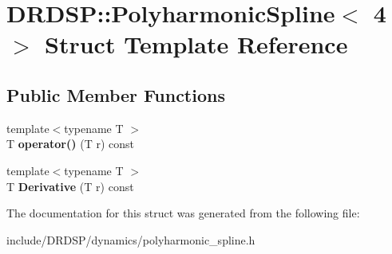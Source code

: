 \hypertarget{struct_d_r_d_s_p_1_1_polyharmonic_spline_3_014_01_4}{\section{D\-R\-D\-S\-P\-:\-:Polyharmonic\-Spline$<$ 4 $>$ Struct Template Reference}
\label{struct_d_r_d_s_p_1_1_polyharmonic_spline_3_014_01_4}
}
\subsection*{Public Member Functions}
\begin{DoxyCompactItemize}
\item 
\hypertarget{struct_d_r_d_s_p_1_1_polyharmonic_spline_3_014_01_4_a59308bf407d1523bf4c3a7f42e00b194}{{\footnotesize template$<$typename T $>$ }\\T {\bfseries operator()} (T r) const }\label{struct_d_r_d_s_p_1_1_polyharmonic_spline_3_014_01_4_a59308bf407d1523bf4c3a7f42e00b194}

\item 
\hypertarget{struct_d_r_d_s_p_1_1_polyharmonic_spline_3_014_01_4_ac7ef51f745007e1c1d475a40761ea06c}{{\footnotesize template$<$typename T $>$ }\\T {\bfseries Derivative} (T r) const }\label{struct_d_r_d_s_p_1_1_polyharmonic_spline_3_014_01_4_ac7ef51f745007e1c1d475a40761ea06c}

\end{DoxyCompactItemize}


The documentation for this struct was generated from the following file\-:\begin{DoxyCompactItemize}
\item 
include/\-D\-R\-D\-S\-P/dynamics/polyharmonic\-\_\-spline.\-h\end{DoxyCompactItemize}
